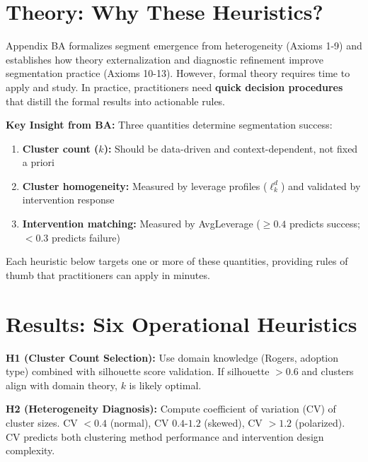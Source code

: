\section{Theory: Why These Heuristics?}
\label{sec:h-theory}

Appendix BA formalizes segment emergence from heterogeneity (Axioms 1-9) and establishes how theory externalization and diagnostic refinement improve segmentation practice (Axioms 10-13). However, formal theory requires time to apply and study. In practice, practitioners need \textbf{quick decision procedures} that distill the formal results into actionable rules.

\textbf{Key Insight from BA:} Three quantities determine segmentation success:

\begin{enumerate}
\item \textbf{Cluster count ($k$):} Should be data-driven and context-dependent, not fixed a priori
\item \textbf{Cluster homogeneity:} Measured by leverage profiles ($\ell_k^d$) and validated by intervention response
\item \textbf{Intervention matching:} Measured by AvgLeverage ($\geq 0.4$ predicts success; $< 0.3$ predicts failure)
\end{enumerate}

Each heuristic below targets one or more of these quantities, providing rules of thumb that practitioners can apply in minutes.

\vspace{1em}


\section{Results: Six Operational Heuristics}
\label{sec:h-results}

\textbf{H1 (Cluster Count Selection):} Use domain knowledge (Rogers, adoption type) combined with silhouette score validation. If silhouette $> 0.6$ and clusters align with domain theory, $k$ is likely optimal.

\textbf{H2 (Heterogeneity Diagnosis):} Compute coefficient of variation (CV) of cluster sizes. CV $< 0.4$ (normal), CV $0.4$-$1.2$ (skewed), CV $> 1.2$ (polarized). CV predicts both clustering method performance and intervention design complexity.


